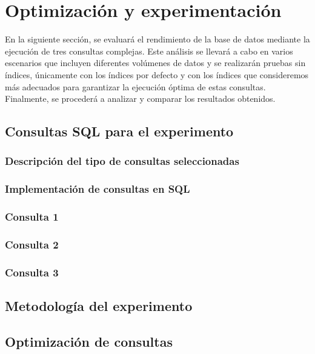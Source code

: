 \section{Optimización y experimentación} {En la siguiente sección, se evaluará el rendimiento de la base de datos mediante la ejecución de tres consultas complejas. Este análisis se llevará a cabo en varios escenarios que incluyen diferentes volúmenes de datos y se realizarán pruebas sin índices, únicamente con los índices por defecto y con los índices que consideremos más adecuados para garantizar la ejecución óptima de estas consultas. Finalmente, se procederá a analizar y comparar los resultados obtenidos.}
\subsection{Consultas SQL para el experimento}
\subsubsection{Descripción del tipo de consultas seleccionadas}
\subsubsection{Implementación de consultas en SQL}
\subsubsection*{Consulta 1}

\subsubsection*{Consulta 2}

\subsubsection*{Consulta 3}


\subsection{Metodología del experimento}

\subsection{Optimización de consultas}
